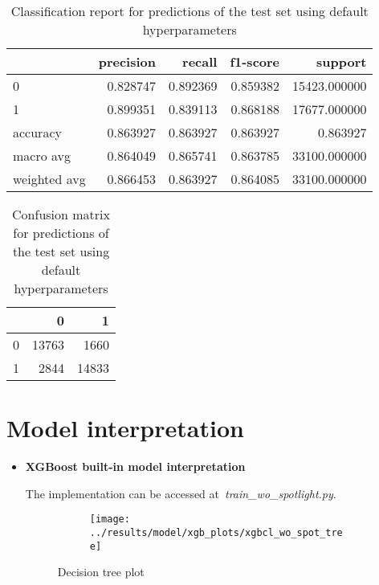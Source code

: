 \documentclass{article}
\begin{document}
{\begin{itemize}
\begin{table}[h!]
\centering
\begin{tabular}{lrrrr}
\toprule
{} &  precision &    recall &  f1-score &       support \\
\midrule
0            &   0.828747 &  0.892369 &  0.859382 &  15423.000000 \\
1            &   0.899351 &  0.839113 &  0.868188 &  17677.000000 \\
accuracy     &   0.863927 &  0.863927 &  0.863927 &      0.863927 \\
macro avg    &   0.864049 &  0.865741 &  0.863785 &  33100.000000 \\
weighted avg &   0.866453 &  0.863927 &  0.864085 &  33100.000000 \\
\bottomrule
\end{tabular}
\caption{Classification report for predictions of the test set using default hyperparameters}
\label{table:model_te_cr}
\end{table}
 
\begin{table}[h!]
\centering
\begin{tabular}{lrr}
\toprule
{} &      0 &      1 \\
\midrule
0 &  13763 &   1660 \\
1 &   2844 &  14833 \\
\bottomrule
\end{tabular}
\caption{Confusion matrix for predictions of the test set using default hyperparameters}
\label{table:model_te_cm}
\end{table}

\end{itemize}

\section{Model interpretation}
\label{sec:interp}

\begin{itemize}
\item \textbf{XGBoost built-in model interpretation}

The implementation can be accessed at~\emph{train\_wo\_spotlight.py}.

\begin{figure}
  \begin{subfigure}{1\linewidth}
    \centering\texttt{[image: ../results/model/xgb\_plots/xgbcl\_wo\_spot\_tree]}
  \end{subfigure}
\caption{Decision tree plot}
\label{fig:tree}
\end{figure}


\end{itemize}}
\end{document}
